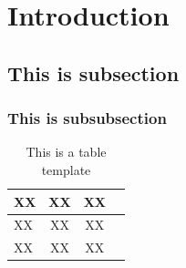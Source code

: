 \documentclass[12pt,a4paper]{article}
\begin{document}
\begin{titlepage}
\begin{center}

\vspace{0.5cm}





\end{center}
\end{titlepage}

\begin{abstract}

\end{abstract}
\vspace{4cm}

\renewcommand{\abstractname}{Acknowledgements}
\begin{abstract}
Thanking people 
\end{abstract}

\newpage

\tableofcontents
\newpage

\listoffigures
\newpage
\listoftables
\newpage


\section{Introduction}
\subsection{This is subsection}
\subsubsection{This is subsubsection}

\begin{table}[H]
\caption{This is a table template}
\centering
\begin{tabular}{l c c c}
\hline\hline
XX & XX & XX  \\ [0.5ex] 
\hline
XX & XX & XX \\
XX & XX & XX \\
[1ex]
\hline
\end{tabular}
\label{table:template}
\end{table}
\end{document}
